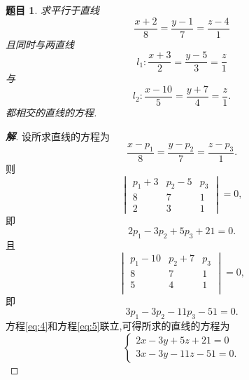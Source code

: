 \documentclass[a4paper]{article}
\newtheorem*{exe}{题目}
\newenvironment{exercise}
{\bigskip\begin{mdframed}\begin{exe}}
    {\end{exe}\end{mdframed}\bigskip}
\begin{document}
\begin{exercise}
求平行于直线
\begin{equation}\label{eq:1}\frac{x+2}{8}=\frac{y-1}{7}=\frac{z-4}{1}\end{equation}
且同时与两直线
\begin{equation}
  \label{eq:2}
  l_1:\frac{x+3}{2}=\frac{y-5}{3}=\frac{z}{1}
\end{equation}
与
\begin{equation}
  \label{eq:3}
  l_2:\frac{x-10}{5}=\frac{y+7}{4}=\frac{z}{1}.
\end{equation}
都相交的直线的方程.
\end{exercise}
\begin{proof}[\textbf{解}]
设所求直线的方程为
$$
\frac{x-p_1}{8}=\frac{y-p_2}{7}=\frac{z-p_3}{1}.
$$
则
$$
\begin{vmatrix}
  p_1+3&p_2-5&p_3\\
8&7&1\\
2&3&1
\end{vmatrix}=0,
$$
即
\begin{equation}
  \label{eq:4}
  2p_1-3p_2+5p_3+21=0.
\end{equation}
且
$$
\begin{vmatrix}
  p_1-10&p_2+7&p_3\\
8&7&1\\
5&4&1\\
\end{vmatrix}=0,
$$
即
\begin{equation}
  \label{eq:5}
  3p_1-3p_2-11p_3-51=0.
\end{equation}
方程\eqref{eq:4}和方程\eqref{eq:5}联立,可得所求的直线的方程为
$$
\begin{cases}
  2x-3y+5z+21=0\\
3x-3y-11z-51=0.
\end{cases}
$$
\end{proof}
\end{document}
